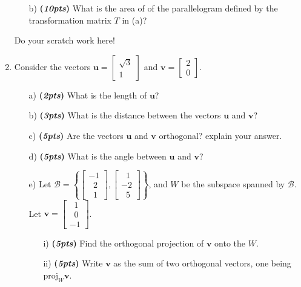 \documentclass[12pt]{article}%
\begin{document}
\begin{enumerate}
\begin{itemize}
        \item[b)]\textbf{(\emph{10pts})} What is the area of  of the parallelogram defined by the transformation matrix \(T\) in (a)?
    \end{itemize}

    \newpage
     Do your scratch work here!
     
    \newpage

    \item Consider  the vectors \(\mathbf{u} =\begin{bmatrix} \sqrt{3} \\ 1 \end{bmatrix}\) and 
    \(\mathbf{v} =\begin{bmatrix} 2 \\ 0 \end{bmatrix}\).
    \begin{itemize}
        \item[a)]\textbf{(\emph{2pts})} What is the length of \(\mathbf{u}\)?
        \vspace{1.5cm}
        \item[b)]\textbf{(\emph{3pts})} What is the distance between the vectors \(\mathbf{u}\) and \(\mathbf{v}\)?
        \vspace{1.5cm}
        \item[c)]\textbf{(\emph{5pts})} Are the vectors \(\mathbf{u}\) and \(\mathbf{v}\) orthogonal? explain your answer.
        \vspace{1.5cm}
        \item[d)]\textbf{(\emph{5pts})} What is the angle between \(\mathbf{u}\) and \(\mathbf{v}\)?
        \vspace{5cm}
        \item[e)] Let \(\mathcal{B} =\left\{\begin{bmatrix} -1 \\ \;\;2 \\ \;\;1\end{bmatrix}, \begin{bmatrix} \;\;1 \\-2\\\;\;5 \end{bmatrix} \right\}\), and \(W\) be the subspace spanned by \(\mathcal{B}\).
        Let \(\mathbf{v} = \begin{bmatrix} \;\;1\\\;\;0 \\-1 \end{bmatrix}\).
        \begin{itemize}
            \item[i)]\textbf{(\emph{5pts})} Find the orthogonal projection of  \(\mathbf{v}\) onto the \(W\).
            \vspace{4cm}
            \item[ii)]\textbf{(\emph{5pts})} Write \(\mathbf{v}\) as the sum of two orthogonal vectors, one being \(\text{proj}_{W} \mathbf{v}\).
        \end{itemize}
    \end{itemize}


\end{enumerate}
\end{document}
